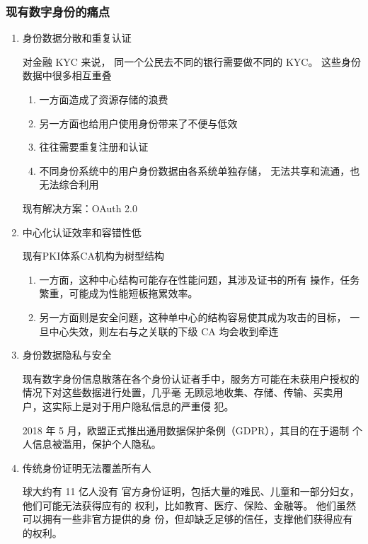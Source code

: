 \documentclass[11pt]{beamer}
\begin{document}
\begin{frame}[allowframebreaks]
	\frametitle{现有数字身份的痛点}
	\begin{enumerate}
		\item 身份数据分散和重复认证
		\begin{example}
			对金融 KYC 来说，
			同一个公民去不同的银行需要做不同的 KYC。 这些身份数据中很多相互重叠
			\begin{enumerate}
				\item 一方面造成了资源存储的浪费
				\item 另一方面也给用户使用身份带来了不便与低效
				\item 往往需要重复注册和认证
				\item 不同身份系统中的用户身份数据由各系统单独存储，
				无法共享和流通，也无法综合利用
			\end{enumerate}
		\end{example}
	
		现有解决方案：OAuth 2.0
		\item 中心化认证效率和容错性低
		\begin{example}
			现有PKI体系CA机构为树型结构
			\begin{enumerate}
				\item 一方面，这种中心结构可能存在性能问题，其涉及证书的所有
				操作，任务繁重，可能成为性能短板拖累效率。
				\item 另一方面则是安全问题，这种单中心的结构容易使其成为攻击的目标，
				一旦中心失效，则左右与之关联的下级 CA 均会收到牵连
			\end{enumerate}
		\end{example}
		\item 身份数据隐私与安全
		
		{\scriptsize 现有数字身份信息散落在各个身份认证者手中，服务方可能在未获用户授权的情况下对这些数据进行处置，几乎毫
无顾忌地收集、存储、传输、买卖用户，这实际上是对于用户隐私信息的严重侵
		犯。}
	
		2018 年 5 月，欧盟正式推出通用数据保护条例（GDPR），其目的在于遏制
		个人信息被滥用，保护个人隐私。
		
		\item 传统身份证明无法覆盖所有人
		
		\begin{example}
			球大约有 11 亿人没有
			官方身份证明，包括大量的难民、儿童和一部分妇女，他们可能无法获得应有的
			权利，比如教育、医疗、保险、金融等。 他们虽然可以拥有一些非官方提供的身
			份，但却缺乏足够的信任，支撑他们获得应有的权利。
		\end{example}
	\end{enumerate}
\end{frame}
\end{document}
